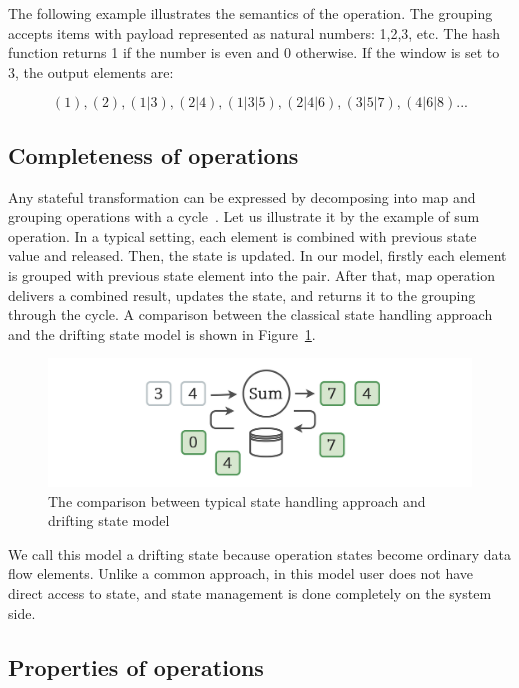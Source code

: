 The following example illustrates the semantics of the operation. The grouping accepts items with payload represented as natural numbers: 1,2,3, etc. The hash function returns 1 if the number is even and 0 otherwise. If the window is set to 3, the output elements are:

\[(1), (2), (1|3), (2|4), (1|3|5), (2|4|6), (3|5|7), (4|6|8)...\]

\subsection{Completeness of operations}

Any stateful transformation can be expressed by decomposing into map and grouping operations with a cycle~\cite{we2018adbis}. Let us illustrate it by the example of sum operation. In a typical setting, each element is combined with previous state value and released. Then, the state is updated. In our model, firstly each element is grouped with previous state element into the pair. After that, map operation delivers a combined result, updates the state, and returns it to the grouping through the cycle. A comparison between the classical state handling approach and the drifting state model is shown in Figure~\ref{classical-drifting}.

\begin{figure}[htbp]
  \centering
  \includegraphics[width=.49\textwidth]{pics/classical-drifting}
  \caption{The comparison between typical state handling approach and drifting state model}
  \label {classical-drifting}
\end{figure}

We call this model a drifting state because operation states become ordinary data flow elements. Unlike a common approach, in this model user does not have direct access to state, and state management is done completely on the system side.

\subsection{Properties of operations}

